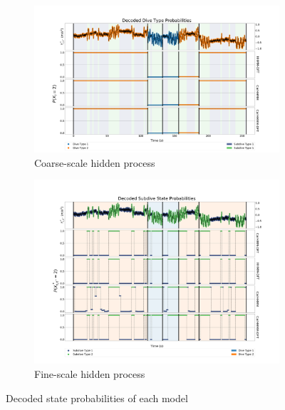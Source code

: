 \begin{figure}[ht]
    \centering
    \begin{subfigure}[t]{1.0\textwidth}
        \centering
        \includegraphics[width=5in]{../Plots/Posterior_Coarse_States.png}
        \caption{Coarse-scale hidden process}
    \end{subfigure}
    \newline
    \begin{subfigure}[t]{1.0\textwidth}
        \centering
        \includegraphics[width=5in]{../Plots/Posterior_Fine_States.png}
        \caption{Fine-scale hidden process}
    \end{subfigure}
	\caption{Decoded state probabilities of each model}
	\label{fig:acc}
\end{figure}

